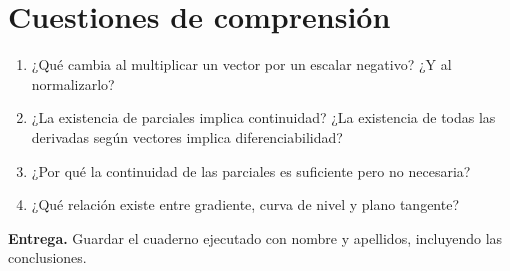 \documentclass[12pt,a4paper]{article}
\begin{document}
\section{Cuestiones de comprensión}
\begin{enumerate}
\item ¿Qué cambia al multiplicar un vector por un escalar negativo? ¿Y al normalizarlo?
\item ¿La existencia de parciales implica continuidad? ¿La existencia de todas las derivadas según vectores implica diferenciabilidad?
\item ¿Por qué la continuidad de las parciales es suficiente pero no necesaria?
\item ¿Qué relación existe entre gradiente, curva de nivel y plano tangente?
\end{enumerate}
\noindent\textbf{Entrega.} Guardar el cuaderno ejecutado con nombre y apellidos, incluyendo las conclusiones.
\end{document}
